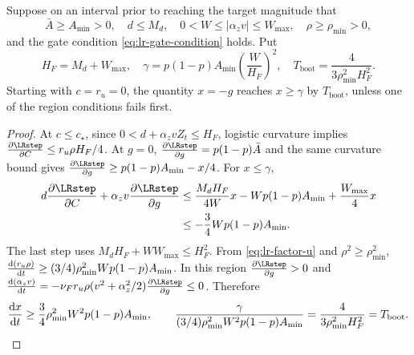 \begin{lrlemma}
\label{lem:lr-feature-bootstrap}
Suppose on an interval prior to reaching the target magnitude that
\begin{equation}\label{eq:lr-amplification-region}
 \bar A\ge A_{\min}>0,\quad
 d\le M_d,\quad
 0<W\le|{\alpha_z v}|\le W_{\max},\quad
 \rho\ge\rho_{\min}>0,
\end{equation}
and the gate condition \eqref{eq:lr-gate-condition} holds.  Put
\begin{equation}\label{eq:lr-gamma-bootstrap}
 H_F=M_d+W_{\max},\quad
 \gamma=p(1-p) A_{\min}\left(\frac W{H_F}\right)^2,
 \quad
 T_{\mathrm{boot}}=\frac4{3\rho_{\min}^2H_F^2}.
\end{equation}
Starting with $c=r_u=0$, the quantity $x=-g$ reaches $x\ge\gamma$
by $T_{\mathrm{boot}}$, unless one of the region conditions fails first.
\end{lrlemma}
\begin{proof}
At $c\le c_\star$, since
$0<d+{\alpha_z v} Z_t\le H_F$, logistic curvature implies
$\pd{\LRstep}{C}\le{r_u\rho} H_F/4$.  At $g=0$, $\pd{\LRstep}{g}=p(1-p)\bar A$ and the
same curvature bound gives $\pd{\LRstep}{g}\ge p(1-p) A_{\min}-x/4$.
For $x\le\gamma$,
\begin{align*}
 d\pd{\LRstep}{C}+\alpha_z v\pd{\LRstep}{g}
 &\le\frac{M_dH_F}{4W}x-Wp(1-p)A_{\min}+\frac{W_{\max}}4x\\
 &\le-\frac34Wp(1-p)A_{\min}.
\end{align*}
The last step uses
$M_d H_F+WW_{\max}\le H_F^2$.
From \eqref{eq:lr-factor-u} and
$\rho^2\ge\rho_{\min}^2$,
$\ddt{(r_u\rho)}\ge(3/4)\rho_{\min}^2Wp(1-p) A_{\min}$.
In this region $\pd{\LRstep}{g}>0$ and
$\ddt{(\alpha_z v)}=-\nu_F{r_u\rho}(v^2+\alpha_z^2/2)\pd{\LRstep}{g}\le0$.
Therefore
\[
 \ddt{x}\ge\frac34\rho_{\min}^2W^2p(1-p)A_{\min},\qquad
 \frac{\gamma}{(3/4)\rho_{\min}^2W^2p(1-p)A_{\min}}
 =\frac4{3\rho_{\min}^2H_F^2}=T_{\mathrm{boot}}.
\]
\end{proof}

